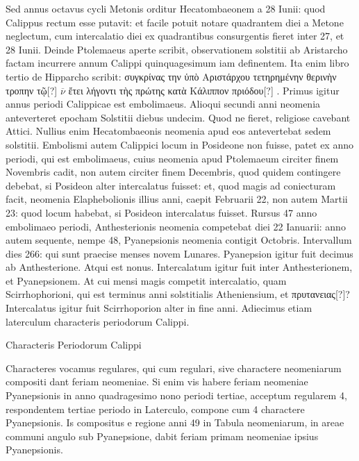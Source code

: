 Sed annus octavus
cycli Metonis orditur Hecatombaeonem a 28 Iunii: quod Calippus
rectum esse putavit: et facile potuit notare quadrantem diei a Metone
neglectum, cum intercalatio diei ex quadrantibus consurgentis fieret
inter 27, et 28 Iunii.
Deinde Ptolemaeus aperte scribit, observationem
solstitii ab Aristarcho factam incurrere annum Calippi quinquagesimum
iam definentem.
Ita enim libro tertio de Hipparcho
scribit:
 \textgreek{συγκρίνας την ὑπὸ Αριστάρχου τετηρημένην θερινὴν τροπην τῷ[?]}
 $\overline\nu$
\textgreek{ἔτει λήγοντι τὴς πρώτης κατὰ Κάλιππον πριόδου[?]} .
Primus igitur annus periodi
Calippicae est embolimaeus.
Alioqui secundi anni neomenia anteverteret
epocham Solstitii diebus undecim.
Quod ne fieret, religiose cavebant
Attici.
Nullius enim Hecatombaeonis neomenia apud eos antevertebat
sedem solstitii.
Embolismi autem Calippici locum in Posideone
non fuisse, patet ex  anno periodi, qui est embolimaeus,
cuius neomenia apud Ptolemaeum circiter finem Novembris cadit, non
autem circiter finem Decembris, quod quidem contingere debebat,
si Posideon alter intercalatus fuisset: et, quod magis ad coniecturam
facit, neomenia Elaphebolionis illius anni, caepit Februarii
22, non autem Martii 23: quod locum habebat, si Posideon intercalatus
fuisset.
Rursus 47 anno embolimaeo periodi, Anthesterionis
neomenia competebat diei 22 Ianuarii: anno autem sequente, nempe
48, Pyanepsionis neomenia contigit  Octobris.
Intervallum
dies 266: qui sunt praecise menses novem Lunares.
Pyanepsion igitur
fuit decimus ab Anthesterione.
Atqui est nonus.
Intercalatum
igitur fuit inter Anthesterionem, et Pyanepsionem.
At cui mensi
magis competit intercalatio, quam Scirrhophorioni, qui est terminus
anni solstitialis Atheniensium, et \textgreek{πρυτανειας[?]}?
Intercalatus igitur fuit Scirrhoporion alter in fine anni.
Adiecimus etiam laterculum characteris periodorum
Calippi.
\begin{table}[htbp]
 
 \caption{Characteris Periodorum Calippi}
 \label{tab:characteris_calippi}
\end{table}

Characteres vocamus regulares, qui
cum regulari, sive charactere neomeniarum compositi
dant feriam neomeniae.
Si enim vis habere feriam neomeniae
Pyanepsionis in anno quadragesimo nono periodi
tertiae, acceptum regularem 4, respondentem tertiae periodo
in Laterculo, compone cum 4 charactere Pyanepsionis.
Is compositus e regione anni 49 in Tabula
neomeniarum, in areae communi angulo sub Pyanepsione, dabit feriam
primam neomeniae ipsius Pyanepsionis.


